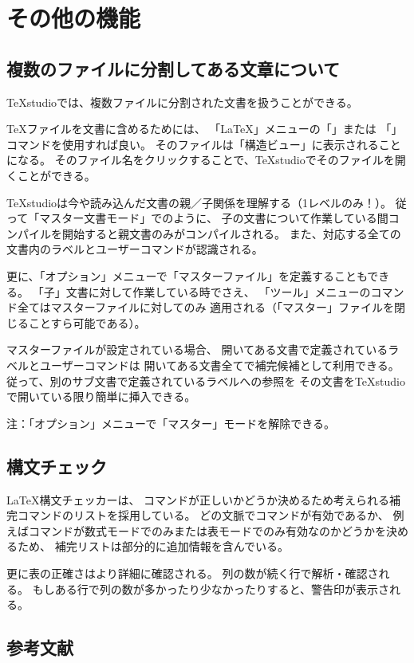 \chapter{その他の機能}

\section{複数のファイルに分割してある文章について}

TeXstudioでは、複数ファイルに分割された文書を扱うことができる。

TeXファイルを文書に含めるためには、
「LaTeX」メニューの「\verb++」または
「\verb++」コマンドを使用すれば良い。
そのファイルは「構造ビュー」に表示されることになる。
そのファイル名をクリックすることで、TeXstudioでそのファイルを開くことができる。

TeXstudioは今や読み込んだ文書の親／子関係を理解する（1レベルのみ！）。
従って「マスター文書モード」でのように、
子の文書について作業している間コンパイルを開始すると親文書のみがコンパイルされる。
また、対応する全ての文書内のラベルとユーザーコマンドが認識される。

更に、「オプション」メニューで「マスターファイル」を定義することもできる。
「子」文書に対して作業している時でさえ、
「ツール」メニューのコマンド全てはマスターファイルに対してのみ
適用される（「マスター」ファイルを閉じることすら可能である）。

マスターファイルが設定されている場合、
開いてある文書で定義されているラベルとユーザーコマンドは
開いてある文書全てで補完候補として利用できる。
従って、別のサブ文書で定義されているラベルへの参照を
その文書をTeXstudioで開いている限り簡単に挿入できる。

注：「オプション」メニューで「マスター」モードを解除できる。

\section{構文チェック}

LaTeX構文チェッカーは、
コマンドが正しいかどうか決めるため考えられる補完コマンドのリストを採用している。
どの文脈でコマンドが有効であるか、
例えばコマンドが数式モードでのみまたは表モードでのみ有効なのかどうかを決めるため、
補完リストは部分的に追加情報を含んでいる。

更に表の正確さはより詳細に確認される。
列の数が続く行で解析・確認される。
もしある行で列の数が多かったり少なかったりすると、警告印が表示される。

\section{参考文献}


